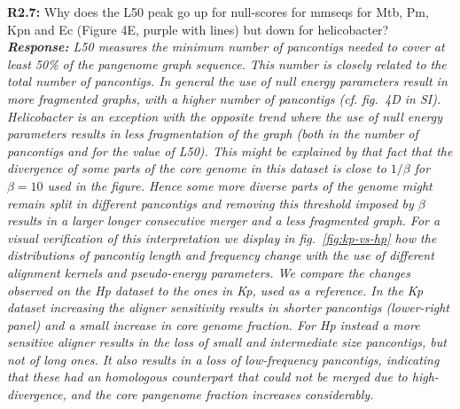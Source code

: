 \documentclass[aps,rmp,onecolumn]{revtex4-1}
\newcommand{\Marco}[1]{{\color{orange}Marco: #1}}
\newcommand{\Liam}[1]{{\color{teal}Liam: #1}}
\newcommand{\reviewer}[2]{\textbf{#1:} #2\vskip 5mm}
\newcommand{\response}[1]{{\it {\color{response}\textbf{Response:} #1}}\vskip 5mm}
\begin{document}
\reviewer{R2.7}{Why does the L50 peak go up for null-scores for mmseqs for Mtb, Pm, Kpn and Ec (Figure 4E, purple with lines) but down for helicobacter?}
\response{L50 measures the minimum number of pancontigs needed to cover at least 50\% of the pangenome graph sequence. This number is closely related to the total number of pancontigs. In general the use of null energy parameters result in more fragmented graphs, with a higher number of pancontigs (cf. fig.~4D in SI). Helicobacter is an exception with the opposite trend where the use of null energy parameters results in less fragmentation of the graph (both in the number of pancontigs and for the value of L50).
      This might be explained by that fact that the divergence of some parts of the core genome in this dataset is close to $1/\beta$ for $
            \beta=10$ used in the figure.
      Hence some more diverse parts of the genome might remain split in different pancontigs and removing this threshold imposed by $\beta$ results in a larger longer consecutive merger and a less fragmented graph.
      For a visual verification of this interpretation we display in fig.~\ref{fig:kp-vs-hp} how the distributions of pancontig length and frequency change with the use of different alignment kernels and pseudo-energy parameters. We compare the changes observed on the Hp dataset to the ones in Kp, used as a reference. In the Kp dataset increasing the aligner sensitivity results in shorter pancontigs (lower-right panel) and a small increase in core genome fraction. For Hp instead a more sensitive aligner results in the loss of small and intermediate size pancontigs, but not of long ones. It also results in a loss of low-frequency pancontigs, indicating that these had an homologous counterpart that could not be merged due to high-divergence, and the core pangenome fraction increases considerably.
}
\end{document}
